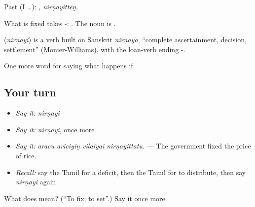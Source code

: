 Past (I …): , \emph{nirṇayittēṉ}.

What is fixed takes -:  . The noun is .

\begin{cousinweb}
\textbf{} (\emph{nirṇayi}) is a verb built on Sanskrit \emph{nirṇaya}, \textquotedblleft{}complete ascertainment, decision, settlement\textquotedblright{} (Monier-Williams), with the loan-verb ending -.
\end{cousinweb}

\begin{grammarlens}[title={What you've built}]
One more word for saying what happens if.
\end{grammarlens}

\subsection*{Your turn}
\begin{itemize}
\raggedright
  \item \emph{Say it:} \emph{nirṇayi}
  \item \emph{Say it:} \emph{nirṇayi}, once more
  \item \emph{Say it:} \emph{aracu ariciyiṉ vilaiyai nirṇayittatu.} — The government fixed the price of rice.
  \item \emph{Recall:} say the Tamil for a deficit, then the Tamil for to distribute, then say \emph{nirṇayi} again
\end{itemize}

\begin{tcolorbox}[breakable,colback=teal!4,colframe=teal!35!black,title={Before you move on}]
What does  mean? (\textquotedblleft{}To fix; to set\textquotedblright{}.) Say it once more.
\end{tcolorbox}
